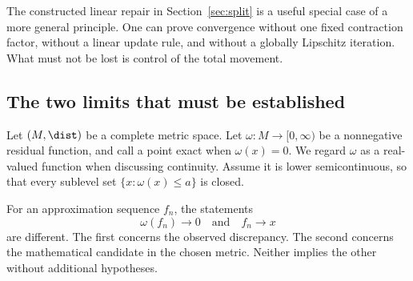 \label{sec:variable-exactification}
The constructed linear repair in Section~\ref{sec:split} is a useful special case of a more general principle. One can prove convergence without one fixed contraction factor, without a linear update rule, and without a globally Lipschitz iteration. What must not be lost is control of the total movement.

\subsection{The two limits that must be established}
Let \((M,\dist)\) be a complete metric space. Let \(\omega:M\to[0,\infty)\) be a nonnegative residual function, and call a point exact when \(\omega(x)=0\). We regard \(\omega\) as a real-valued function when discussing continuity. Assume it is lower semicontinuous, so that every sublevel set \(\{x:\omega(x)\le a\}\) is closed.

For an approximation sequence \(f_n\), the statements
\[
 \omega(f_n)\longrightarrow0
 \quad\text{and}\quad
 f_n\longrightarrow x
\]
are different. The first concerns the observed discrepancy. The second concerns the mathematical candidate in the chosen metric. Neither implies the other without additional hypotheses.

